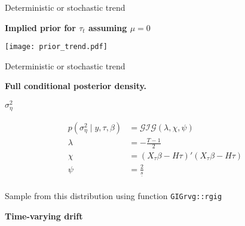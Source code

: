 \documentclass[notes,blackandwhite,mathsans,usenames,dvipsnames]{beamer}
\begin{document}
\begin{frame}{Deterministic or stochastic trend}

\bigskip
\begin{center}
\textbf{Implied prior for $\tau_t$ assuming $\mu=0$}

\texttt{[image: prior\_trend.pdf]}
\end{center}
\end{frame}




\begin{frame}{Deterministic or stochastic trend}

\textbf{Full conditional posterior density.}

 $\sigma_\eta^2$

\begin{align*}
p\left(\sigma_\eta^2 \mid y, \tau, \beta \right) &= \mathcal{GIG}\left(\lambda, \chi, \psi \right)\\[1ex]
\lambda &= - \frac{T-1}{2} \\
\chi &= (X_\tau \beta - H\tau)'(X_\tau \beta - H\tau) \\ 
\psi &= \frac{2}{\underline{s}}\\
\end{align*}

{\color{mcxs2}Sample from this distribution using function} \texttt{GIGrvg::rgig}

\end{frame}








{
\begin{frame}

\begin{adjustwidth}{-0.5cm}{0cm}
\vspace{8.3cm}
\Large\textbf{{\color{mcxs2}Time-varying } {\color{mcxs1}drift}}
\end{adjustwidth}

\end{frame}
}
\end{document}
